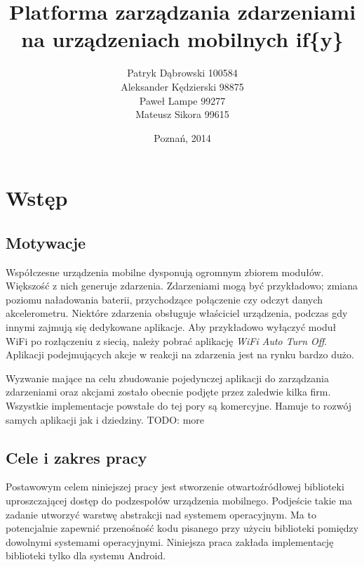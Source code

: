 \documentclass[11pt,a4paper,polish,thesis]{dcsbook}
\begin{document}
\author{Patryk Dąbrowski 100584\\ Aleksander Kędzierski 98875\\ Paweł Lampe 99277\\ Mateusz Sikora 99615}
\title{Platforma zarządzania zdarzeniami na urządzeniach mobilnych if\{y\}}
\date{Poznań, 2014}

\maketitle

\frontmatter

\tableofcontents{}

\mainmatter

\chapter{Wstęp}
\section{Motywacje}
Współczesne urządzenia mobilne dysponują ogromnym zbiorem modułów. Większość z nich generuje zdarzenia. Zdarzeniami mogą być przykładowo; zmiana poziomu naładowania
baterii, przychodzące połączenie czy odczyt danych akcelerometru. Niektóre zdarzenia obsługuje właściciel urządzenia, podczas gdy innymi zajmują się dedykowane
aplikacje. Aby przykładowo wyłączyć moduł WiFi po rozłączeniu z siecią, należy pobrać aplikację \emph{WiFi Auto Turn Off}. Aplikacji podejmujących akcje w reakcji
na zdarzenia jest na rynku bardzo dużo.

Wyzwanie mające na celu zbudowanie pojedynczej aplikacji do zarządzania zdarzeniami oraz akcjami zostało obecnie podjęte przez zaledwie kilka firm. Wszystkie
implementacje powstałe do tej pory są komercyjne. Hamuje to rozwój samych aplikacji jak i dziedziny. TODO: more
\section{Cele i zakres pracy}
Postawowym celem niniejszej pracy jest stworzenie otwartoźródłowej biblioteki uproszczającej dostęp do podzespołów urządzenia mobilnego. Podjeście takie ma zadanie
utworzyć warstwę abstrakcji nad systemem operacyjnym. Ma to potencjalnie zapewnić przenośność kodu pisanego przy użyciu biblioteki pomiędzy dowolnymi systemami
operacyjnymi. Niniejsza praca zakłada implementację biblioteki tylko dla systemu Android.
\end{document}
